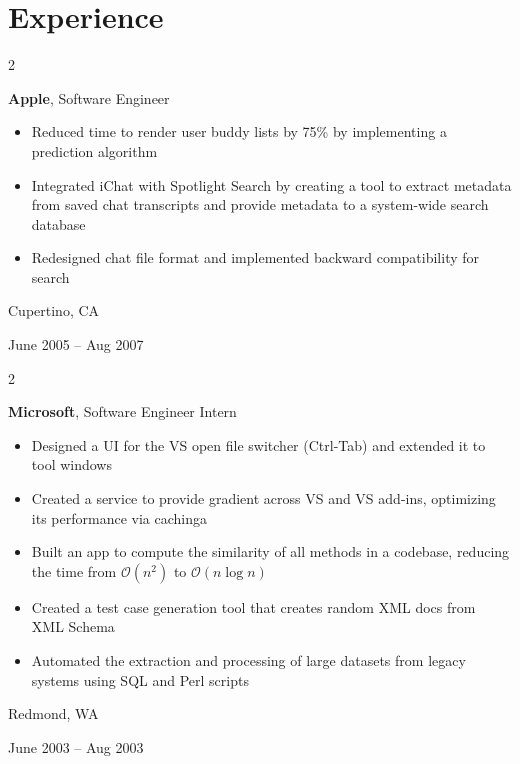 \documentclass[10pt, letterpaper]{article}
\newenvironment{highlights}{
        \begin{itemize}[
            topsep=0.10 cm,
            parsep=0.10 cm,
            partopsep=0pt,
            itemsep=0pt,
            leftmargin=0.4 cm + 10pt
        ]
    }{
        \end{itemize}
    } %
\newenvironment{twocolentry}[2][]{
        \onecolentry
        \def\secondColumn{#2}
        \setcolumnwidth{\fill, 4.5 cm}
        \begin{paracol}{2}
    }{
        \switchcolumn \raggedleft \secondColumn
        \end{paracol}
        \endonecolentry
    } %
\begin{document}
        
        \section{Experience}



            
            \begin{twocolentry}{
                Cupertino, CA

            June 2005 – Aug 2007
            }
                \textbf{Apple}, Software Engineer
                \begin{highlights}
                    \item Reduced time to render user buddy lists by 75\% by implementing a prediction algorithm
                    \item Integrated iChat with Spotlight Search by creating a tool to extract metadata from saved chat transcripts and provide metadata to a system-wide search database
                    \item Redesigned chat file format and implemented backward compatibility for search
                \end{highlights}
            \end{twocolentry}


            \vspace{0.2 cm}

            \begin{twocolentry}{
                Redmond, WA

            June 2003 – Aug 2003
            }
                \textbf{Microsoft}, Software Engineer Intern
                \begin{highlights}
                    \item Designed a UI for the VS open file switcher (Ctrl-Tab) and extended it to tool windows
                    \item Created a service to provide gradient across VS and VS add-ins, optimizing its performance via cachinga
                    \item Built an app to compute the similarity of all methods in a codebase, reducing the time from $\mathcal{O}(n^2)$ to $\mathcal{O}(n \log n)$
                    \item Created a test case generation tool that creates random XML docs from XML Schema
                    \item Automated the extraction and processing of large datasets from legacy systems using SQL and Perl scripts
                \end{highlights}
            \end{twocolentry}
\end{document}
